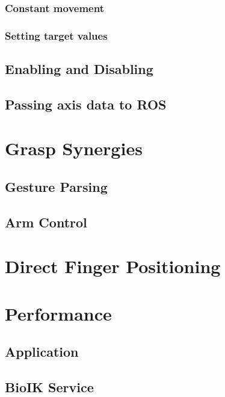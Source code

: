 \subsubsection{Constant movement}

\subsubsection{Setting target values}

\subsection{Enabling and Disabling}

\subsection{Passing axis data to ROS}
\label{sec:impl:aximgrros}

\section{Grasp Synergies}

\subsection{Gesture Parsing}

\subsection{Arm Control}

\section{Direct Finger Positioning}

\section{Performance}

\subsection{Application}

\subsection{BioIK Service}